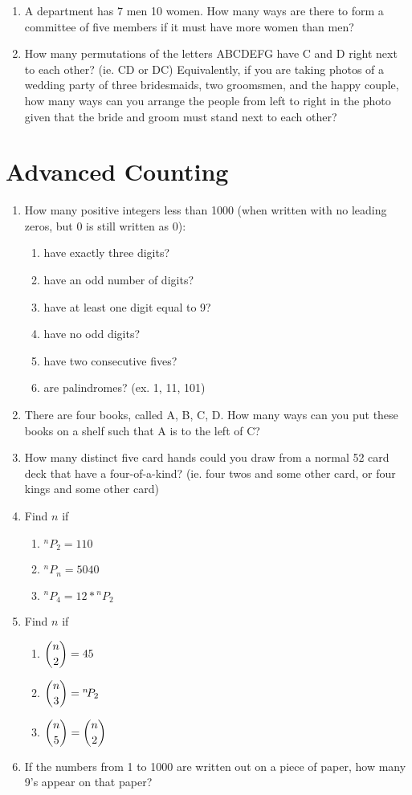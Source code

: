 \documentclass{article}
\newcommand*{\Perm}[2]{{}^{#1}\!P_{#2}}%
\begin{document}
\begin{enumerate}
\item A department has 7 men 10 women. How many ways are there to form a committee of five members if it must have more women than men?

\item How many permutations of the letters ABCDEFG have C and D right next to each other? (ie. CD or DC) Equivalently, if you are taking photos of a wedding party of three bridesmaids, two groomsmen, and the happy couple, how many ways can you arrange the people from left to right in the photo given that the bride and groom must stand next to each other?
\end{enumerate}


\section{Advanced Counting}
\begin{enumerate}
\item How many positive integers less than 1000 (when written with no leading zeros, but 0 is still written as 0):
  \begin{enumerate}
  \item have exactly three digits?
  \item have an odd number of digits?
  \item have at least one digit equal to 9?
  \item have no odd digits?
  \item have two consecutive fives?
  \item are palindromes? (ex. 1, 11, 101)
  \end{enumerate}

\item There are four books, called A, B, C, D. How many ways can you put these books on a shelf such that A is to the left of C?

\item How many distinct five card hands could you draw from a normal 52 card deck that have a four-of-a-kind? (ie. four twos and some other card, or four kings and some other card)

\item Find $n$ if
  \begin{enumerate}
  \item $\Perm{n}{2} = 110$
  \item $\Perm{n}{n} = 5040$
  \item $\Perm{n}{4} = 12 * \Perm{n}{2}$
  \end{enumerate}

\item Find $n$ if
  \begin{enumerate}
  \item $ \dbinom{n}{2} = 45$
  \item $ \dbinom{n}{3} = \Perm{n}{2}$
  \item $ \dbinom{n}{5}= \dbinom{n}{2}$
  \end{enumerate}

\item If the numbers from 1 to 1000 are written out on a piece of paper, how many 9's appear on that paper?
\end{enumerate}
\end{document}
